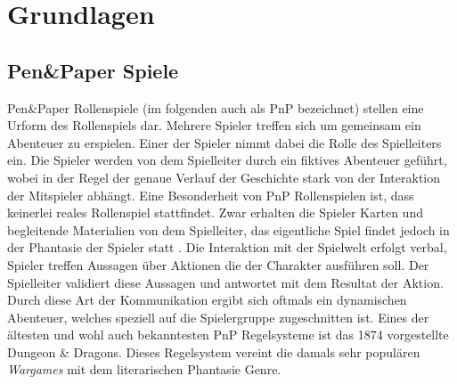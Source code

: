 \chapter{Grundlagen}
\label{background}





\section{Pen\&Paper Spiele}
\label{sec:PenPaperSpiele}


Pen\&Paper Rollenspiele (im folgenden auch als PnP bezeichnet) stellen eine Urform des Rollenspiels dar. Mehrere Spieler treffen sich um gemeinsam ein Abenteuer zu erspielen. Einer der Spieler nimmt dabei die Rolle des Spielleiters ein. Die Spieler werden von dem Spielleiter durch ein fiktives Abenteuer geführt, wobei in der Regel der genaue Verlauf der Geschichte stark von der Interaktion der Mitspieler abhängt.\cite{Apperley2006}\newline 
Eine Besonderheit von PnP Rollenspielen ist, dass keinerlei reales Rollenspiel stattfindet. Zwar erhalten die Spieler Karten und begleitende Materialien von dem Spielleiter, das eigentliche Spiel findet jedoch in der Phantasie der Spieler statt \cite{Copier2005}. Die Interaktion mit der Spielwelt erfolgt verbal, Spieler treffen Aussagen über Aktionen die der Charakter ausführen soll. Der Spielleiter validiert diese Aussagen und antwortet mit dem Resultat der Aktion. Durch diese Art der Kommunikation ergibt sich oftmals ein dynamischen Abenteuer, welches speziell auf die Spielergruppe zugeschnitten ist. \cite{Drachen2008}\newline
Eines der ältesten und wohl auch bekanntesten PnP Regelsysteme ist das 1874 vorgestellte Dungeon \& Dragons. Dieses Regelsystem vereint die damals sehr populären \emph{Wargames} mit dem literarischen Phantasie Genre.\cite{Copier2005}

